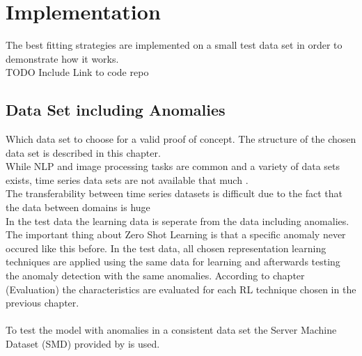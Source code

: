 \section{Implementation}\label{implementation}
The best fitting strategies are implemented on a small test data set in order to demonstrate how it works.\\
TODO Include Link to code repo
\subsection{Data Set including Anomalies}
Which data set to choose for a valid proof of concept. The structure of the chosen data set is described in this chapter.\\
While NLP and image processing tasks are common and a variety of data sets exists, time series data sets are not available that much \cite{ma_survey_2023}. \\
The transferability between time series datasets is difficult due to the fact that the data between domains is huge \cite{ma_survey_2023}\\
In the test data the learning data is seperate from the data including anomalies. The important thing about Zero Shot Learning is that a specific anomaly never occured like this before. In the test data, all chosen representation learning techniques are applied using the same data for learning and afterwards testing the anomaly detection with the same anomalies. According to chapter (Evaluation) the characteristics are evaluated for each RL technique chosen in the previous chapter.\\\\
To test the model with anomalies in a consistent data set the Server Machine Dataset (SMD) provided by  is used.\\\\
%
%
%
